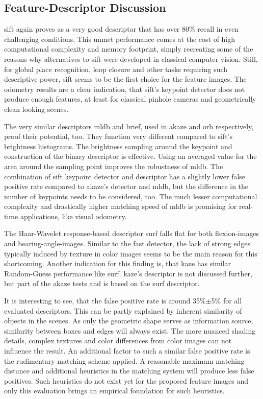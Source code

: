 \subsection{Feature-Descriptor Discussion}

\acrshort{sift} again proves as a very good descriptor that has over 80\% recall in even challenging conditions.
This unmet performance comes at the cost of high computational complexity and memory footprint, simply recreating some of the reasons why alternatives to \acrshort{sift} were developed in classical computer vision.
Still, for global place recognition, loop closure and other tasks requiring such descriptive power, \acrshort{sift} seems to be the first choice for the feature images.
The odometry results are a clear indication, that \acrshort{sift}'s keypoint detector does not produce enough features, at least for classical pinhole cameras and geometrically clean looking scenes.

The very similar descriptors \acrshort{mldb} and \acrshort{brief}, used in \acrshort{akaze} and \acrshort{orb} respectively, proof their potential, too.
They function very different compared to \acrshort{sift}'s brightness histograms.
The brightness sampling around the keypoint and construction of the binary descriptor is effective.
Using an averaged value for the area around the sampling point improves the robustness of \acrshort{mldb}.
The combination of \acrshort{sift} keypoint detector and descriptor has a slightly lower false positive rate compared to \acrshort{akaze}'s detector and \acrshort{mldb}, but the difference in the number of keypoints needs to be considered, too.
The much lesser computational complexity and drastically higher matching speed of \acrshort{mldb} is promising for real-time applications, like visual odometry.

The Haar-Wavelet response-based descriptor \acrshort{surf} falls flat for both \glspl{flexion-image} and \glspl{bearing-angle-image}.
Similar to the \acrshort{fast} detector, the lack of strong edges typically induced by texture in color images seems to be the main reason for this shortcoming.
Another indication for this finding is, that \acrshort{kaze} has similar Random-Guess performance like \acrshort{surf}.
\acrshort{kaze}'s descriptor is not discussed further, but part of the \acrshort{akaze} tests and is based on the \acrshort{surf} descriptor.

It is interesting to see, that the false positive rate is around 35\%$\pm$5\% for all evaluated descriptors.
This can be partly explained by inherent similarity of objects in the scenes.
As only the geometric shape serves as information source, similarity between boxes and edges will always exist.
The more nuanced shading details, complex textures and color differences from color images can not influence the result.
An additional factor to such a similar false positive rate is the rudimentary matching scheme applied.
A reasonable maximum matching distance and additional heuristics in the matching system will produce less false positives.
Such heuristics do not exist yet for the proposed feature images and only this evaluation brings an empirical foundation for such heuristics.
